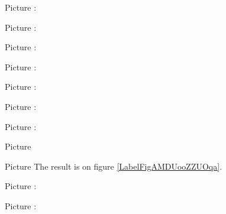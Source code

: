 Picture : 
\begin{center}
   
\end{center}


\clearpage

\huge
Picture : 
\begin{center}
   
\end{center}
\normalsize


Picture : 
\begin{center}
   
\end{center}



Picture : 
\begin{center}
   
\end{center}


Picture : 
\begin{center}
   
\end{center}


Picture : 
\begin{center}
   
\end{center}



Picture : 
\begin{center}
   
\end{center}



Picture 
\begin{center}
   
\end{center}

Picture 
The result is on figure \ref{LabelFigAMDUooZZUOqa}. %
\newcommand{\CaptionFigAMDUooZZUOqa}{<+Type your caption here+>}




Picture : 
\begin{center}
   
\end{center}



Picture : 
\begin{center}
   
\end{center}

